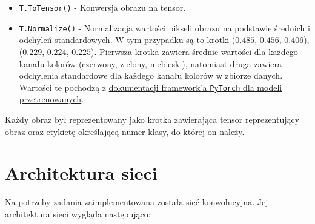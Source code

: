 \documentclass[11pt]{article}
\begin{document}
\begin{itemize}
		\item \texttt{T.ToTensor()} - Konwersja obrazu na tensor.
		\item \texttt{T.Normalize()} - Normalizacja wartości pikseli obrazu na podstawie średnich i odchyleń standardowych. W tym przypadku są to krotki ($0.485$, $0.456$, $0.406$), ($0.229$, $0.224$, $0.225$).
			Pierwsza krotka zawiera średnie wartości dla każdego kanału kolorów (czerwony, zielony, niebieski), natomiast druga zawiera odchylenia standardowe dla każdego kanału kolorów w zbiorze danych.
			Wartości te pochodzą z \href{https://pytorch.org/vision/stable/models.html}{dokumentacji framework'a \texttt{PyTorch} dla modeli przetrenowanych}.
	\end{itemize}

	Każdy obraz był reprezentowany jako krotka zawierająca tensor reprezentujący obraz oraz etykietę określającą numer klasy, do której on należy.

	\section{Architektura sieci}
	Na potrzeby zadania zaimplementowana została sieć konwolucyjna. Jej architektura sieci wygląda następująco:
\end{document}
